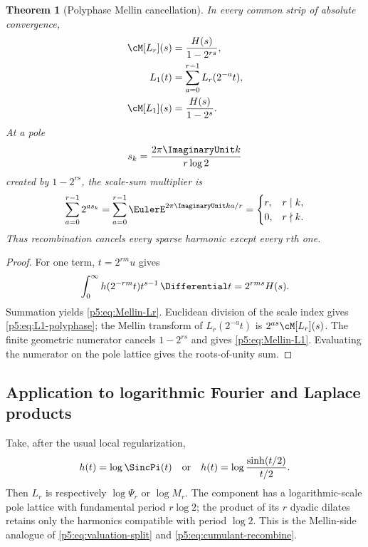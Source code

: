 \documentclass[11pt]{article}
\newtheorem{theorem}{Theorem}[section]
\theoremstyle{definition}
\theoremstyle{remark}
\begin{document}
\begin{theorem}[Polyphase Mellin cancellation]
\label{p5:thm:Mellin-cancellation}
In every common strip of absolute convergence,
\begin{align}
 \cM[L_r](s)&=\frac{H(s)}{1-2^{rs}},                        \label{p5:eq:Mellin-Lr}\\
 L_1(t)&=\sum_{a=0}^{r-1}L_r(2^{-a}t),                      \label{p5:eq:L1-polyphase}\\
 \cM[L_1](s)&=\frac{H(s)}{1-2^s}.                          \label{p5:eq:Mellin-L1}
\end{align}
At a pole
\begin{equation}
 s_k=\frac{2\pi\ImaginaryUnit k}{r\log2}                              \label{p5:eq:sparse-pole-lattice}
\end{equation}
created by $1-2^{rs}$, the scale-sum multiplier is
\begin{equation}
 \sum_{a=0}^{r-1}2^{as_k}
 =\sum_{a=0}^{r-1}\EulerE^{2\pi\ImaginaryUnit ka/r}
 =\begin{cases}r,&r\mid k,\\0,&r\nmid k.
 \end{cases}                                               \label{p5:eq:roots-unity-cancel}
\end{equation}
Thus recombination cancels every sparse harmonic except every $r$th one.
\end{theorem}

\begin{proof}
For one term, $t=2^{rm}u$ gives
\[
 \int_0^{\infty}h(2^{-rm}t)t^{s-1}\,\Differential t=2^{rms}H(s).
\]
Summation yields \eqref{p5:eq:Mellin-Lr}.  Euclidean division of the scale index
gives \eqref{p5:eq:L1-polyphase}; the Mellin transform of $L_r(2^{-a}t)$ is
$2^{as}\cM[L_r](s)$.  The finite geometric numerator cancels
$1-2^{rs}$ and gives \eqref{p5:eq:Mellin-L1}.  Evaluating the numerator on the
pole lattice gives the roots-of-unity sum.
\end{proof}

\subsection{Application to logarithmic Fourier and Laplace products}

Take, after the usual local regularization,
\begin{equation}
 h(t)=\log\SincPi(t)
 \quad\text{or}\quad
 h(t)=\log\frac{\sinh(t/2)}{t/2}.                           \label{p5:eq:Mellin-kernels}
\end{equation}
Then $L_r$ is respectively $\log\Psi_r$ or $\log M_r$.  The component has a
logarithmic-scale pole lattice with fundamental period $r\log2$; the product of
its $r$ dyadic dilates retains only the harmonics compatible with period
$\log2$.  This is the Mellin-side analogue of
\eqref{p5:eq:valuation-split} and \eqref{p5:eq:cumulant-recombine}.
\end{document}

